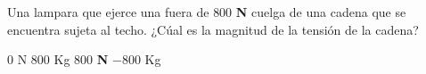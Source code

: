
\question Una lampara que ejerce una fuera de $800$
          \textbf{N} cuelga de una cadena que se encuentra sujeta al techo.
          ¿Cúal es la magnitud de la tensión de la cadena?

  \begin{oneparchoices}
    \choice $0$ N
    \choice $800$ Kg
    \choice $800$ \textbf{N}
    \choice $-800$ Kg
  \end{oneparchoices}

